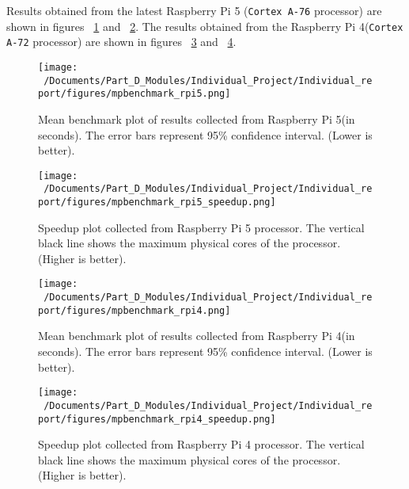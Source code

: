 Results obtained from the latest Raspberry Pi 5 (\texttt{Cortex A-76} processor) are shown in figures ~\ref{fig:mpbenchmark_rpi5_plot} and ~\ref{fig:mpbenchmark_rpi5_speedup_plot}. The results obtained from the Raspberry Pi 4(\texttt{Cortex A-72} processor) are shown in figures ~\ref{fig:mpbenchmark_rpi4_plot} and ~\ref{fig:mpbenchmark_rpi4_speedup_plot}.

\begin{figure}[htbp] %
	\centering
	\texttt{[image: ~/Documents/Part\_D\_Modules/Individual\_Project/Individual\_report/figures/mpbenchmark\_rpi5.png]} %
	\caption{Mean benchmark plot of results collected from Raspberry Pi 5(in seconds). The error bars represent 95\% confidence interval. (Lower is better).}
	\label{fig:mpbenchmark_rpi5_plot} %
\end{figure}

\begin{figure}[htbp] %
	\centering
	\texttt{[image: ~/Documents/Part\_D\_Modules/Individual\_Project/Individual\_report/figures/mpbenchmark\_rpi5\_speedup.png]} %
	\caption{Speedup plot collected from Raspberry Pi 5 processor. The vertical black line shows the maximum physical cores of the processor. (Higher is better).}
	\label{fig:mpbenchmark_rpi5_speedup_plot} %
\end{figure}

\begin{figure}[htbp] %
	\centering
	\texttt{[image: ~/Documents/Part\_D\_Modules/Individual\_Project/Individual\_report/figures/mpbenchmark\_rpi4.png]} %
	\caption{Mean benchmark plot of results collected from Raspberry Pi 4(in seconds). The error bars represent 95\% confidence interval. (Lower is better).}
	\label{fig:mpbenchmark_rpi4_plot} %
\end{figure}

\begin{figure}[htbp] %
	\centering
	\texttt{[image: ~/Documents/Part\_D\_Modules/Individual\_Project/Individual\_report/figures/mpbenchmark\_rpi4\_speedup.png]} %
	\caption{Speedup plot collected from Raspberry Pi 4 processor. The vertical black line shows the maximum physical cores of the processor. (Higher is better).}
	\label{fig:mpbenchmark_rpi4_speedup_plot} %
\end{figure}

